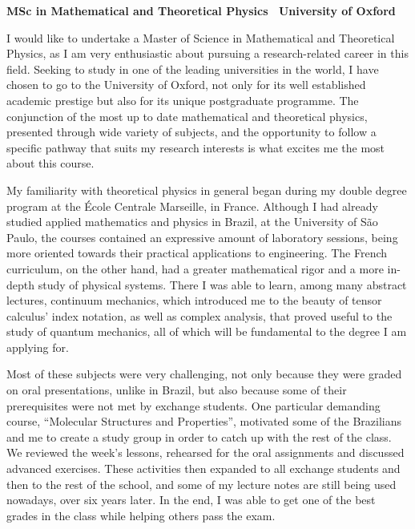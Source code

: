 \documentclass[11pt]{article}
\newcommand*{\NEWLINE}{\vspace{0.75em}}
\begin{document}
\sffamily %

{\bfseries MSc in Mathematical and Theoretical Physics \textemdash~University of Oxford}
\NEWLINE{}

I would like to undertake a Master of Science in Mathematical and Theoretical Physics, as I am very enthusiastic about pursuing a research-related career in this field. Seeking to study in one of the leading universities in the world, I have chosen to go to the University of Oxford, not only for its well established academic prestige but also for its unique postgraduate programme. The conjunction of the most up to date mathematical and theoretical physics, presented through wide variety of subjects, and the opportunity to follow a specific pathway that suits my research interests is what excites me the most about this course. \NEWLINE{}

My familiarity with theoretical physics in general began during my double degree program at the École Centrale Marseille, in France. Although I had already studied applied mathematics and physics in Brazil, at the University of São Paulo, the courses contained an expressive amount of laboratory sessions, being more oriented towards their practical applications to engineering. The French curriculum, on the other hand, had a greater mathematical rigor and a more in-depth study of physical systems. There I was able to learn, among many abstract lectures, continuum mechanics, which introduced me to the beauty of tensor calculus' index notation, as well as complex analysis, that proved useful to the study of quantum mechanics, all of which will be fundamental to the degree I am applying for. \NEWLINE{}

Most of these subjects were very challenging, not only because they were graded on oral presentations, unlike in Brazil, but also because some of their prerequisites were not met by exchange students. One particular demanding course, ``Molecular Structures and Properties'', motivated some of the Brazilians and me to create a study group in order to catch up with the rest of the class. We reviewed the week's lessons, rehearsed for the oral assignments and discussed advanced exercises. These activities then expanded to all exchange students and then to the rest of the school, and some of my lecture notes are still being used nowadays, over six years later. In the end, I was able to get one of the best grades in the class while helping others pass the exam. \NEWLINE{}
\end{document}
